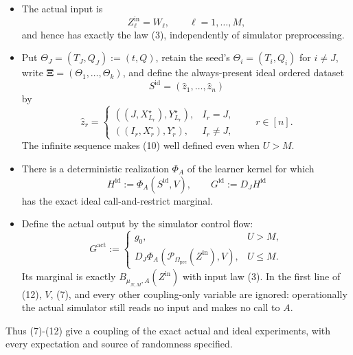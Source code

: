 \begin{lemma}
\begin{itemize}
\item The actual input is
  \[
    Z^{\mathrm{in}}_\ell=W_\ell,\qquad \ell=1,\ldots,M,
  \tag{8}
  \]
  and hence has exactly the law (3), independently of simulator
  preprocessing.
\item Put \(\Theta_J=(T_J,Q_J):=(t,Q)\), retain the seed's
  \(\Theta_i=(T_i,Q_i)\) for \(i\ne J\), write
  \(\boldsymbol\Xi=(\Theta_1,\ldots,\Theta_k)\), and define the always-present
  ideal ordered dataset
  \[
    S^{\mathrm{id}}=(\widehat z_1,\ldots,\widehat z_n)
  \tag{9}
  \]
  by
  \[
    \widehat z_r=
    \begin{cases}
      ((J,X_{L_r}^\star),Y_{L_r}^\star),&I_r=J,\\[1mm]
      ((I_r,X_r^\circ),Y_r^\circ),&I_r\ne J,
    \end{cases}
    \qquad r\in[n].
  \tag{10}
  \]
  The infinite sequence makes (10) well defined even when \(U>M\).
\item There is a deterministic realization \(\Phi_A\) of the learner kernel
  for which
  \[
    H^{\mathrm{id}}:=\Phi_A(S^{\mathrm{id}},V),
    \qquad
    G^{\mathrm{id}}:=D_JH^{\mathrm{id}}
  \tag{11}
  \]
  has the exact ideal call-and-restrict marginal.
\item Define the actual output by the simulator control flow:
  \[
    G^{\mathrm{act}}:=
    \begin{cases}
      g_0,&U>M,\\
      D_J\Phi_A(\mathcal P_{\Omega_{\mathrm{pre}}}
                    (Z^{\mathrm{in}}),V),&U\le M.
    \end{cases}
  \tag{12}
  \]
  Its marginal is exactly
  \(B_{\mu_{N,M},A}(Z^{\mathrm{in}})\) with input law (3).
  In the first line of (12), \(V\), (7), and every other coupling-only
  variable are ignored: operationally the actual simulator still reads no
  input and makes no call to \(A\).
\end{itemize}

Thus (7)-(12) give a coupling of the exact actual and ideal experiments,
with every expectation and source of randomness specified.
\end{lemma}

